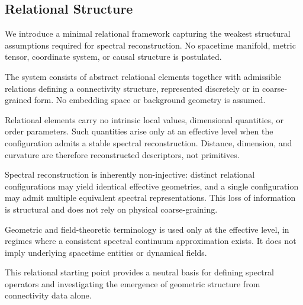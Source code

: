 \subsection{Relational Structure}
  \label{subsec:relational-structure}

  We introduce a minimal relational framework capturing the weakest structural
  assumptions required for spectral reconstruction.
  No spacetime manifold, metric tensor, coordinate system, or causal structure
  is postulated.

  The system consists of abstract relational elements together with admissible
  relations defining a connectivity structure, represented discretely or in
  coarse-grained form.
  No embedding space or background geometry is assumed.

  Relational elements carry no intrinsic local values, dimensional quantities,
  or order parameters.
  Such quantities arise only at an effective level when the configuration admits
  a stable spectral reconstruction.
  Distance, dimension, and curvature are therefore reconstructed descriptors,
  not primitives.

  Spectral reconstruction is inherently non-injective:
  distinct relational configurations may yield identical effective geometries,
  and a single configuration may admit multiple equivalent spectral
  representations.
  This loss of information is structural and does not rely on physical
  coarse-graining.

  Geometric and field-theoretic terminology is used only at the effective level,
  in regimes where a consistent spectral continuum approximation exists.
  It does not imply underlying spacetime entities or dynamical fields.

  This relational starting point provides a neutral basis for defining spectral
  operators and investigating the emergence of geometric structure from
  connectivity data alone.
